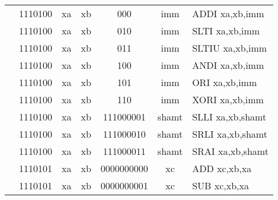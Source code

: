\begin{table}[p]
\begin{small}
\begin{center}
\begin{tabular}{rcccccccccl}
&
\multicolumn{2}{|c|}{1110100} &
\multicolumn{1}{c|}{xa} &
\multicolumn{1}{c|}{xb} &
\multicolumn{1}{c|}{000} &
\multicolumn{4}{c|}{imm} & ADDI xa,xb,imm \\
\cline{2-10}
  

&
\multicolumn{2}{|c|}{1110100} &
\multicolumn{1}{c|}{xa} &
\multicolumn{1}{c|}{xb} &
\multicolumn{1}{c|}{010} &
\multicolumn{4}{c|}{imm} & SLTI xa,xb,imm \\
\cline{2-10}
  

&
\multicolumn{2}{|c|}{1110100} &
\multicolumn{1}{c|}{xa} &
\multicolumn{1}{c|}{xb} &
\multicolumn{1}{c|}{011} &
\multicolumn{4}{c|}{imm} & SLTIU xa,xb,imm \\
\cline{2-10}
  

&
\multicolumn{2}{|c|}{1110100} &
\multicolumn{1}{c|}{xa} &
\multicolumn{1}{c|}{xb} &
\multicolumn{1}{c|}{100} &
\multicolumn{4}{c|}{imm} & ANDI xa,xb,imm \\
\cline{2-10}
  

&
\multicolumn{2}{|c|}{1110100} &
\multicolumn{1}{c|}{xa} &
\multicolumn{1}{c|}{xb} &
\multicolumn{1}{c|}{101} &
\multicolumn{4}{c|}{imm} & ORI xa,xb,imm \\
\cline{2-10}
  

&
\multicolumn{2}{|c|}{1110100} &
\multicolumn{1}{c|}{xa} &
\multicolumn{1}{c|}{xb} &
\multicolumn{1}{c|}{110} &
\multicolumn{4}{c|}{imm} & XORI xa,xb,imm \\
\cline{2-10}
  

&
\multicolumn{2}{|c|}{1110100} &
\multicolumn{1}{c|}{xa} &
\multicolumn{1}{c|}{xb} &
\multicolumn{3}{c|}{111000001} &
\multicolumn{2}{c|}{shamt} & SLLI xa,xb,shamt \\
\cline{2-10}
  

&
\multicolumn{2}{|c|}{1110100} &
\multicolumn{1}{c|}{xa} &
\multicolumn{1}{c|}{xb} &
\multicolumn{3}{c|}{111000010} &
\multicolumn{2}{c|}{shamt} & SRLI xa,xb,shamt \\
\cline{2-10}
  

&
\multicolumn{2}{|c|}{1110100} &
\multicolumn{1}{c|}{xa} &
\multicolumn{1}{c|}{xb} &
\multicolumn{3}{c|}{111000011} &
\multicolumn{2}{c|}{shamt} & SRAI xa,xb,shamt \\
\cline{2-10}
  

&
\multicolumn{2}{|c|}{1110101} &
\multicolumn{1}{c|}{xa} &
\multicolumn{1}{c|}{xb} &
\multicolumn{4}{c|}{0000000000} &
\multicolumn{1}{c|}{xc} & ADD xc,xb,xa \\
\cline{2-10}
  

&
\multicolumn{2}{|c|}{1110101} &
\multicolumn{1}{c|}{xa} &
\multicolumn{1}{c|}{xb} &
\multicolumn{4}{c|}{0000000001} &
\multicolumn{1}{c|}{xc} & SUB xc,xb,xa \\
\cline{2-10}
  


\end{tabular}
\end{center}
\end{small}
\end{table}
